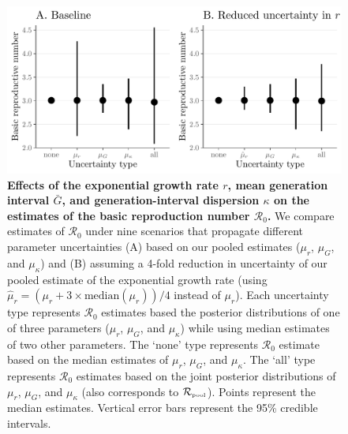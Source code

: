 \documentclass[12pt]{article}
\newcommand{\Ro}{\ensuremath{{\mathcal R}_{0}}\xspace}
\newcommand{\Rpool}{\ensuremath{{\mathcal R}_{\textrm{\tiny{pool}}}}\xspace}
\begin{document}
\begin{figure}[!ht]
\includegraphics[width=\textwidth]{figure2.pdf}
\caption{
  \textbf{Effects of the exponential growth rate $r$, mean generation interval $\bar G$, and generation-interval dispersion $\kappa$ on the estimates of the basic reproduction number \Ro.}
We compare estimates of \Ro under nine scenarios that propagate different parameter uncertainties (A) based on our pooled estimates ($\mu_r$, $\mu_G$, and $\mu_\kappa$) and (B) assuming a 4-fold reduction in uncertainty of our pooled estimate of the exponential growth rate (using $\hat{\mu}_r = (\mu_r + 3\times\mathrm{median}(\mu_r))/4$ instead of $\mu_r$).
Each uncertainty type represents \Ro estimates based the posterior distributions of one of three parameters ($\mu_r$, $\mu_G$, and $\mu_\kappa$) while using median estimates of two other parameters.
The `none' type represents \Ro estimate based on the median estimates of $\mu_r$, $\mu_G$, and $\mu_\kappa$.
The `all' type represents \Ro estimates based on the joint posterior distributions of  $\mu_r$, $\mu_G$, and $\mu_\kappa$ (also corresponds to \Rpool).
Points represent the median estimates.
Vertical error bars represent the 95\% credible intervals.
}
\label{fig:eff}
\end{figure}
\end{document}
